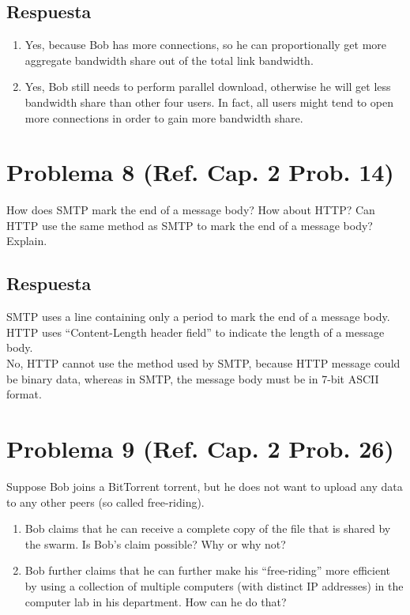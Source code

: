 \documentclass[10pt,spanish]{article}
\numberwithin{figure}{section} %
\begin{document}
\subsection*{Respuesta}

\begin{enumerate}
\item Yes, because Bob has more connections, so he can proportionally get more aggregate bandwidth share out of the total link bandwidth.
\item Yes, Bob still needs to perform parallel download, otherwise he will get less bandwidth share than other four users. In fact, all users might tend to open more connections in order to gain more bandwidth share.
\end{enumerate}

\section[Problema 8]{Problema 8 \textnormal{\Large{(Ref. Cap. 2 Prob. 14)}}}

How does SMTP mark the end of a message body? How about HTTP? Can HTTP use the same method as SMTP to mark the end of a message body? Explain.

\subsection*{Respuesta}

SMTP uses a line containing only a period to mark the end of a message body.\\
HTTP uses ``Content-Length header field'' to indicate the length of a message body.\\
No, HTTP cannot use the method used by SMTP, because HTTP message could be binary data, whereas in SMTP, the message body must be in 7-bit ASCII format.

\section[Problema 9]{Problema 9 \textnormal{\Large{(Ref. Cap. 2 Prob. 26)}}}

Suppose Bob joins a BitTorrent torrent, but he does not want to upload any data to any other peers (so called free-riding).

\begin{enumerate}
\item Bob claims that he can receive a complete copy of the file that is shared by the swarm. Is Bob’s claim possible? Why or why not? 
\item Bob further claims that he can further make his ``free-riding'' more efficient by using a collection of multiple computers (with distinct IP addresses) in the computer lab in his department. How can he do that?
\end{enumerate}
\end{document}
